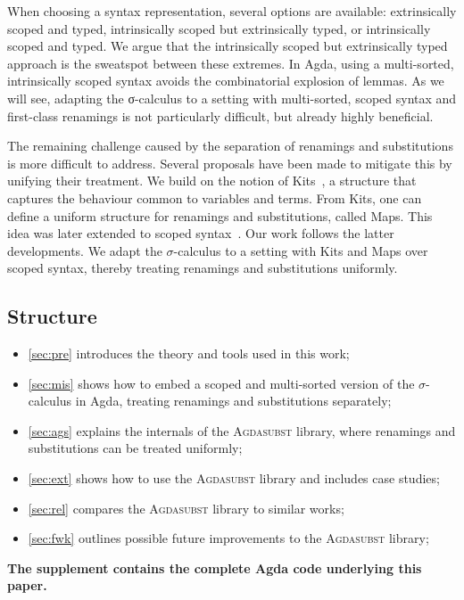 \documentclass[screen,nonacm]{acmart}
\begin{document}
When choosing a syntax representation, several options are available:
extrinsically scoped and typed, intrinsically scoped but extrinsically typed,
or intrinsically scoped and typed. We argue that the intrinsically scoped but
extrinsically typed approach is the sweatspot between these extremes. In Agda,
using a multi-sorted, intrinsically scoped syntax avoids the combinatorial
explosion of lemmas. As we will see, adapting the σ-calculus to a setting with
multi-sorted, scoped syntax and first-class renamings is not particularly
difficult, but already highly beneficial.

The remaining challenge caused by the separation of renamings and substitutions
is more difficult to address. Several proposals have been made to mitigate this
by unifying their treatment. We build on the notion of Kits~\cite{CITE1}, a
structure that captures the behaviour common to variables and terms. From Kits,
one can define a uniform structure for renamings and substitutions, called
Maps. This idea was later extended to scoped syntax~\cite{CITE2}. Our work
follows the latter developments. We adapt the $σ$-calculus to a setting with
Kits and Maps over scoped syntax, thereby treating renamings and substitutions
uniformly.
\subsection*{Structure}

\begin{itemize}
      \item \cref{sec:pre} introduces the theory and tools used in this work;
      \item \cref{sec:mis} shows how to embed a scoped and multi-sorted version of the $\sigma$-calculus in Agda, treating renamings and substitutions separately;
      \item \cref{sec:ags} explains the internals of the \textsc{Agdasubst} library, where renamings and substitutions can be treated uniformly;
      \item \cref{sec:ext} shows how to use the \textsc{Agdasubst} library and includes case studies;
      \item \cref{sec:rel} compares the \textsc{Agdasubst} library to similar works;
      \item \cref{sec:fwk} outlines possible future improvements to the \textsc{Agdasubst} library;
\end{itemize}

\noindent\textbf{The supplement contains the complete Agda code underlying this paper.}
\end{document}
